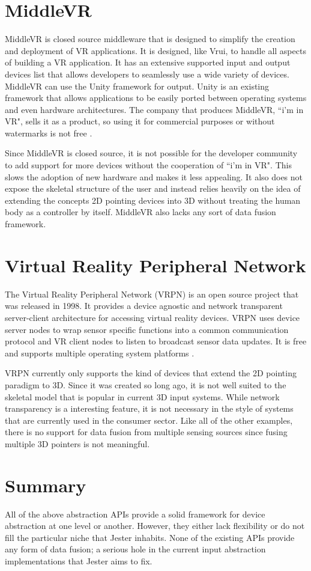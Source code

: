 \section{MiddleVR}

MiddleVR is closed source middleware that is designed to simplify the creation and deployment of VR applications. It is designed, like Vrui, to handle all aspects of building a VR application. It has an extensive supported input and output devices list that allows developers to seamlessly use a wide variety of devices. MiddleVR can use the Unity framework for output. Unity is an existing framework that allows applications to be easily ported between operating systems and even hardware architectures. The company that produces MiddleVR, ``i’m in VR", sells it as a product, so using it for commercial purposes or without watermarks is not free \cite{middle_vr}.

Since MiddleVR is closed source, it is not possible for the developer community to add support for more devices without the cooperation of ``i’m in VR". This slows the adoption of new hardware and makes it less appealing. It also does not expose the skeletal structure of the user and instead relies heavily on the idea of extending the concepts 2D pointing devices into 3D without treating the human body as a controller by itself. MiddleVR also lacks any sort of data fusion framework.

\section{Virtual Reality Peripheral Network}

The Virtual Reality Peripheral Network (VRPN) is an open source project that was released in 1998. It provides a device agnostic and network transparent server-client architecture for accessing virtual reality devices. VRPN uses device server nodes to wrap sensor specific functions into a common communication protocol and VR client nodes to listen to broadcast sensor data updates. It is free and supports multiple operating system platforms \cite{vrpn}.

VRPN currently only supports the kind of devices that extend the 2D pointing paradigm to 3D. Since it was created so long ago, it is not well suited to the skeletal model that is popular in current 3D input systems. While network transparency is a interesting feature, it is not necessary in the style of systems that are currently used in the consumer sector. Like all of the other examples, there is no support for data fusion from multiple sensing sources since fusing multiple 3D pointers is not meaningful.

\section{Summary}

All of the above abstraction APIs provide a solid framework for device abstraction at one level or another. However, they either lack flexibility or do not fill the particular niche that Jester inhabits. None of the existing APIs provide any form of data fusion; a serious hole in the current input abstraction implementations that Jester aims to fix.